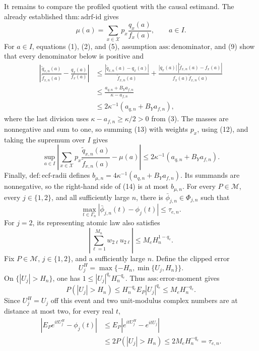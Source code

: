 It remains to compare the profiled quotient with the causal estimand.  The
already established \(\mathrm{thm{:}adrf\text{-}id}\) gives
\[
 \mu(a)=\sum_{x\in\mathcal X}p_x\frac{q_x(a)}{f_x(a)},
 \qquad a\in I.                                                     \tag{12}
\]
For \(a\in I\), equations (1), (2), and (5), assumption
\(\mathrm{ass{:}denominator}\), and (9) show that every denominator below
is positive and
\[
 \begin{aligned}
 \left|\frac{\widetilde q_{x,n}(a)}{\widetilde f_{x,n}(a)}
       -\frac{q_x(a)}{f_x(a)}\right|
 &\le
 \frac{|\widetilde q_{x,n}(a)-q_x(a)|}{\widetilde f_{x,n}(a)}
 +\frac{|q_x(a)|\,|\widetilde f_{x,n}(a)-f_x(a)|}
        {f_x(a)\widetilde f_{x,n}(a)}\\
 &\le\frac{a_{q,n}+B_Ya_{f,n}}{\kappa-a_{f,n}}\\
 &\le2\kappa^{-1}(a_{q,n}+B_Ya_{f,n}),                            \tag{13}
 \end{aligned}
\]
where the last division uses \(\kappa-a_{f,n}\ge\kappa/2>0\) from (3).
The masses are nonnegative and sum to one, so summing (13) with weights
\(p_x\), using (12), and taking the supremum over \(I\) gives
\[
 \sup_{a\in I}\left|
 \sum_{x\in\mathcal X}p_x
 \frac{\widetilde q_{x,n}(a)}{\widetilde f_{x,n}(a)}-\mu(a)
 \right|
 \le2\kappa^{-1}(a_{q,n}+B_Ya_{f,n}).                              \tag{14}
\]
Finally, \(\mathrm{def{:}ecf\text{-}radii}\) defines
\(b_{\mu,n}=4\kappa^{-1}(a_{q,n}+B_Ya_{f,n})\).  Its summands are
nonnegative, so the right-hand side of (14) is at most \(b_{\mu,n}\).
For every \(P\in\mathcal M\), every \(j\in\{1,2\}\), and all sufficiently
large \(n\), there is \(\bar\phi_{j,n}\in\Phi_{j,n}\) such that
\[
 \max_{t\in\Gamma_n}|\bar\phi_{j,n}(t)-\phi_j(t)|\le\tau_{e,n}.
\]
For \(j=2\), its representing atomic law also satisfies
\[
 \left|\sum_{\ell=1}^{M_n}w_{2\ell}u_{2\ell}\right|
 \le M_eH_n^{1-q_e}.
\]
Fix \(P\in\mathcal M\), \(j\in\{1,2\}\), and a sufficiently large \(n\).
Define the clipped error
\[
 U_j^H=\max\{-H_n,\min\{U_j,H_n\}\}.
\]
On \(\{|U_j|>H_n\}\), one has
\(1\le|U_j|^{q_e}H_n^{-q_e}\).  Thus
\(\mathrm{ass{:}error\text{-}moment}\) gives
\[
 P(|U_j|>H_n)
 \le H_n^{-q_e}E_P|U_j|^{q_e}
 \le M_eH_n^{-q_e}.                                                \tag{1}
\]
Since \(U_j^H=U_j\) off this event and two unit-modulus complex numbers are
at distance at most two, for every real \(t\),
\[
 \begin{aligned}
 |E_Pe^{itU_j^H}-\phi_j(t)|
 &\le E_P|e^{itU_j^H}-e^{itU_j}|\\
 &\le2P(|U_j|>H_n)
 \le2M_eH_n^{-q_e}=\tau_{e,n}.                                    \tag{2}
 \end{aligned}
\]
